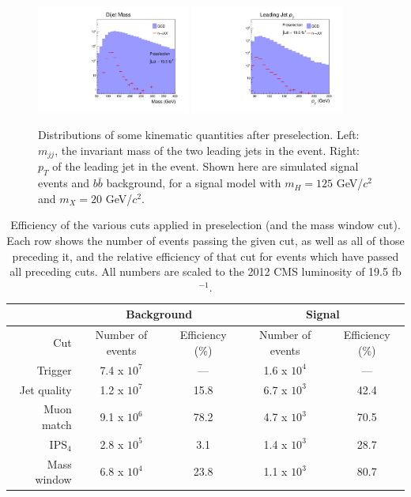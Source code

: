 \documentclass{JHEP3}
\newcommand{\IPS}{\textrm{IPS}}
\begin{document}
\begin{figure}[ht]
\centering
\includegraphics[width=0.45\textwidth]{pre_mjj.pdf}
\includegraphics[width=0.45\textwidth]{pre_pt1.pdf}
\caption{Distributions of some kinematic quantities after preselection. Left: $m_{jj}$, the invariant
  mass of the two leading jets in the event. Right: $p_T$ of the leading jet in the event. Shown here are
  simulated signal events and $b\bar{b}$ background, for a signal model with $m_H = 125$ GeV/$c^2$ and $m_X =
  20$ GeV/$c^2$.}
\label{fig:preselection}
\end{figure}

\begin{table}[h]
\begin{center}
\begin{tabular}{|r|c|c|c|c|}
\hline
 & \multicolumn{2}{c}{Background} & \multicolumn{2}{c|}{Signal} \\
\hline
Cut & Number of events & Efficiency (\%) & Number of events & Efficiency (\%) \\
\hline
Trigger & 7.4 x $10^7$ & --- & 1.6 x $10^4$ & --- \\
Jet quality & 1.2 x $10^7$ & 15.8 & 6.7 x $10^3$ & 42.4 \\
Muon match & 9.1 x $10^6$ & 78.2 & 4.7 x $10^3$ & 70.5 \\
$\IPS_{4}$ & 2.8 x $10^5$ & 3.1 & 1.4 x $10^3$ & 28.7 \\
\hline
Mass window & 6.8 x $10^4$ & 23.8 & 1.1 x $10^3$ & 80.7 \\
\hline
\end{tabular}
\end{center}
\caption{Efficiency of the various cuts applied in preselection (and the mass window cut). Each row shows the
  number of events passing the given cut, as well as all of those preceding it, and the relative efficiency of
  that cut for events which have passed all preceding cuts. All numbers are scaled to the 2012 CMS luminosity
  of 19.5 fb$^{-1}$.}
\label{tab:preselection}
\end{table}
\end{document}
